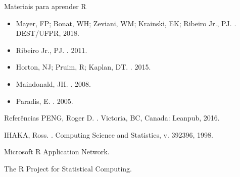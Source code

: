 \documentclass[
  ignorenonframetext,
  serif,
  professionalfont,
  usenames,
  dvipsnames,
  aspectratio = 169]{beamer}
\begin{document}
\begin{frame}{Materiais para aprender R}
\label{materiais-para-aprender-r}
\begin{itemize}
\item
  Mayer, FP; Bonat, WH; Zeviani, WM; Krainski, EK; Ribeiro Jr., PJ.
  \href{http://cursos.leg.ufpr.br/ecr/}{\color{blue}{Estatística Computacional com R}}.
  DEST/UFPR, 2018.
\item
  Ribeiro Jr., PJ.
  \href{http://www.leg.ufpr.br/~paulojus/embrapa/Rembrapa/}{\color{blue}{Introdução ao Ambiente Estatístico R}}.
  2011.
\item
  Horton, NJ; Pruim, R; Kaplan, DT.
  \href{http://cran-r.c3sl.ufpr.br/doc/contrib/Horton+Pruim+Kaplan_MOSAIC-StudentGuide.pdf}{\color{blue}{A Student's Guide to R}}.
  2015.
\item
  Maindonald, JH.
  \href{http://cran-r.c3sl.ufpr.br/doc/contrib/usingR.pdf}{\color{blue}{Using R for Data Analysis and Graphics}}.
  2008.
\item
  Paradis, E.
  \href{http://cran-r.c3sl.ufpr.br/doc/contrib/Paradis-rdebuts_en.pdf}{\color{blue}{R for Beginners}}.
  2005.
\end{itemize}
\end{frame}

\begin{frame}{Referências}
\label{referuxeancias}
PENG, Roger D.
\href{https://bookdown.org/rdpeng/rprogdatascience/}{\color{blue}{R programming for data science}}.
Victoria, BC, Canada: Leanpub, 2016.

IHAKA, Ross.
\href{https://www.stat.auckland.ac.nz/~ihaka/downloads/Interface98.pdf}{\color{blue}{R: Past and future history}}.
Computing Science and Statistics, v. 392396, 1998.

Microsoft R Application Network.
\href{https://mran.microsoft.com/documents/what-is-r}{\color{blue}{What is R?}}

The R Project for Statistical Computing.
\href{https://www.r-project.org/about.html}{\color{blue}{What is R?}}
\end{frame}
\end{document}

